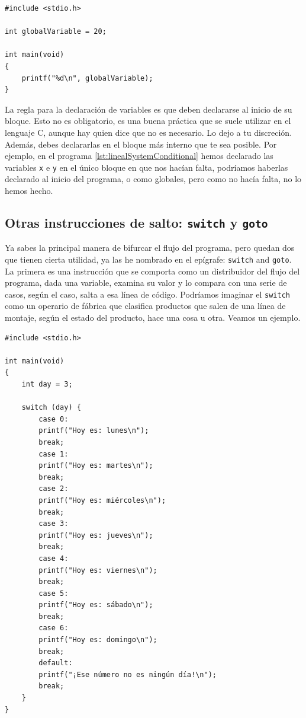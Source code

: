 \documentclass[a4paper]{article}
\begin{document}
\noindent
\begin{minipage}[H]{\linewidth}
\mbox{}
\begin{lstlisting}[style=C,
caption={Ejemplo de programa con una variable global},
label={lst:globalVar}]
#include <stdio.h>

int globalVariable = 20;

int main(void)
{
    printf("%d\n", globalVariable);
}
\end{lstlisting}
\end{minipage}


La regla para la declaración de variables es que deben declararse al inicio
de su bloque. Esto no es obligatorio, es una buena práctica que se suele
utilizar en el lenguaje C, aunque hay quien dice que no es necesario. Lo dejo
a tu discreción.
Además, debes declararlas en el bloque más interno que te sea
posible. Por ejemplo, en el programa \ref{lst:linealSystemConditional}
hemos declarado
las variables \texttt{x} e \texttt{y} en el único bloque en que nos hacían
falta, podríamos haberlas declarado al inicio del programa, o como globales,
pero como no hacía falta, no lo hemos hecho.

\subsection{Otras instrucciones de salto: \texttt{switch} y \texttt{goto}}
Ya sabes la principal manera de bifurcar el flujo del programa, pero
quedan dos que tienen cierta utilidad, ya las he nombrado en el epígrafe:
\verb!switch! and \verb!goto!. La primera es una instrucción que se comporta
como un distribuidor del flujo del programa, dada una variable, examina su valor
y lo compara con una serie de casos, según el caso, salta a esa línea de código.
Podríamos imaginar el \verb!switch! como un operario de fábrica que clasifica
productos que salen de una línea de montaje, según el estado del producto, hace
una cosa u otra. Veamos un ejemplo.


\noindent
\begin{minipage}[H]{\linewidth}
\mbox{}
\begin{lstlisting}[style=C,
caption={Ejemplo de programa con un \texttt{switch}},
label={lst:switchExample}]
#include <stdio.h>

int main(void)
{
    int day = 3;

    switch (day) {
        case 0:
        printf("Hoy es: lunes\n");
        break;
        case 1:
        printf("Hoy es: martes\n");
        break;
        case 2:
        printf("Hoy es: miércoles\n");
        break;
        case 3:
        printf("Hoy es: jueves\n");
        break;
        case 4:
        printf("Hoy es: viernes\n");
        break;
        case 5:
        printf("Hoy es: sábado\n");
        break;
        case 6:
        printf("Hoy es: domingo\n");
        break;
        default:
        printf("¡Ese número no es ningún día!\n");
        break;
    }
}
\end{lstlisting}
\end{minipage}
\end{document}
